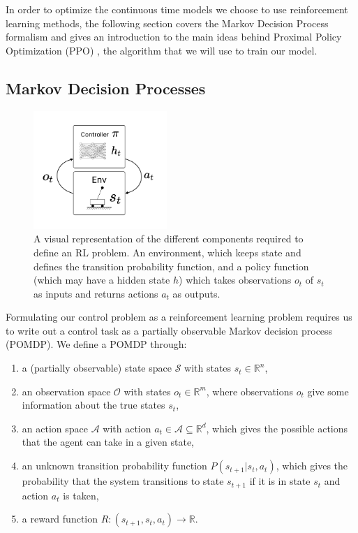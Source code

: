 In order to optimize the continuous time models we choose to use reinforcement learning methods, the following section covers the Markov Decision Process formalism and gives an introduction to the main ideas behind Proximal Policy Optimization (PPO) \cite{schulman2017ppo}, the algorithm that we will use to train our model. \\%

\subsection{Markov Decision Processes}

\begin{figure}[h!]
    \centering
    \includegraphics[width=0.45\textwidth]{figures/system.pdf}
    \caption{A visual representation of the different components required to define an RL problem. An environment, which keeps state and defines the transition probability function, and a policy function (which may have a hidden state $h$) which takes observations $o_t$ of $s_t$ as inputs and returns actions $a_t$ as outputs.}
\end{figure}

Formulating our control problem as a reinforcement learning problem requires us to write out a control task as a partially observable Markov decision process (POMDP). We define a POMDP through:
\begin{enumerate}
    \item a (partially observable) state space $\mathcal{S}$ with states $s_t\in \mathbb{R}^n$,
    \item an observation space $\mathcal{O}$ with states $o_t\in \mathbb{R}^m$, where observations $o_t$ give some information about the true states $s_t$,
    \item an action space $\mathcal{A}$ with action $a_t \in \mathcal{A}\subseteq\mathbb{R}^d$, which gives the possible actions that the agent can take in a given state,
    \item an unknown transition probability function $P(s_{t+1}|s_{t},a_{t})$, which gives the probability that the system transitions to state $s_{t+1}$ if it is in state $s_{t}$ and action $a_t$ is taken,
    \item a reward function $R:(s_{t+1},s_t,a_t) \rightarrow \mathbb{R}$.
\end{enumerate}

